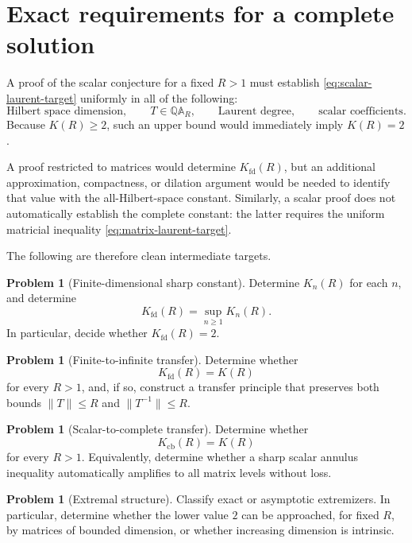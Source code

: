 \documentclass[11pt]{article}
\theoremstyle{definition}
\newtheorem{problem}[theorem]{Problem}
\theoremstyle{remark}
\newcommand{\QAR}{\mathbb Q\mathbb A_R}
\newcommand{\cb}{\mathrm{cb}}
\newcommand{\fd}{\mathrm{fd}}
\begin{document}
\section{Exact requirements for a complete solution}

A proof of the scalar conjecture for a fixed \(R>1\) must establish
\eqref{eq:scalar-laurent-target} uniformly in all of the following:
\[
 \text{Hilbert space dimension},\qquad
 T\in\QAR,\qquad
 \text{Laurent degree},\qquad
 \text{scalar coefficients}.
\]
Because \(K(R)\geq2\), such an upper bound would immediately imply
\(K(R)=2\).

A proof restricted to matrices would determine
\(K_{\fd}(R)\), but an additional approximation, compactness, or
dilation argument would be needed to identify that value with the
all-Hilbert-space constant.  Similarly, a scalar proof does not
automatically establish the complete constant: the latter requires
the uniform matricial inequality \eqref{eq:matrix-laurent-target}.

The following are therefore clean intermediate targets.

\begin{problem}[Finite-dimensional sharp constant]
\label{prob:finite-dimensional}
Determine \(K_n(R)\) for each \(n\), and determine
\[
 K_{\fd}(R)=\sup_{n\geq1}K_n(R).
\]
In particular, decide whether \(K_{\fd}(R)=2\).
\end{problem}

\begin{problem}[Finite-to-infinite transfer]
\label{prob:finite-infinite}
Determine whether
\[
 K_{\fd}(R)=K(R)
\]
for every \(R>1\), and, if so, construct a transfer principle that
preserves both bounds
\(\|T\|\leq R\) and \(\|T^{-1}\|\leq R\).
\end{problem}

\begin{problem}[Scalar-to-complete transfer]
\label{prob:scalar-complete}
Determine whether
\[
 K_{\cb}(R)=K(R)
\]
for every \(R>1\).  Equivalently, determine whether a sharp scalar
annulus inequality automatically amplifies to all matrix levels
without loss.
\end{problem}

\begin{problem}[Extremal structure]
\label{prob:extremals}
Classify exact or asymptotic extremizers.  In particular, determine
whether the lower value \(2\) can be approached, for fixed \(R\), by
matrices of bounded dimension, or whether increasing dimension is
intrinsic.
\end{problem}
\end{document}
